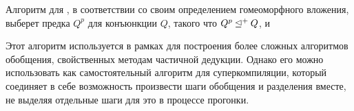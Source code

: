 Алгоритм для \forcpd, в соответствии со своим определением гомеоморфного вложения,
выберет предка $Q^p$ для конъюнкции $Q$, такого что $Q^p \unlhd^+ Q$, и

Этот алгоритм используется в рамках \forcpd для построения более сложных алгоритмов обобщения,
свойственных методам частичной дедукции. Однако его можно использовать как самостоятельный
алгоритм для суперкомпиляции, который соединяет в себе возможность произвести шаги обобщения
и разделения вместе, не выделяя отдельные шаги для это в процессе прогонки.
